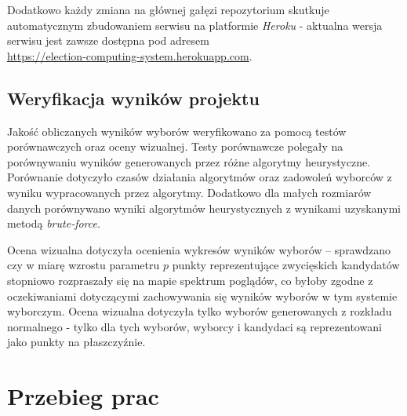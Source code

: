 \documentclass[pdflatex,11pt]{../aghdoc_version2}
\begin{document}
Dodatkowo każdy zmiana na głównej gałęzi repozytorium skutkuje automatycznym zbudowaniem serwisu na platformie \textit{Heroku} - aktualna wersja serwisu jest zawsze dostępna pod adresem \\  \url{https://election-computing-system.herokuapp.com}.

\section{Weryfikacja wyników projektu}
Jakość obliczanych wyników wyborów weryfikowano za pomocą testów
porównawczych oraz oceny wizualnej. Testy porównawcze polegały na porównywaniu wyników generowanych przez różne
algorytmy heurystyczne. Porównanie dotyczyło czasów działania algorytmów oraz zadowoleń wyborców z wyniku wypracowanych przez algorytmy. Dodatkowo dla małych rozmiarów danych porównywano wyniki algorytmów heurystycznych z wynikami uzyskanymi metodą \textit{brute-force}.

Ocena wizualna dotyczyła ocenienia wykresów wyników wyborów – sprawdzano czy w miarę wzrostu parametru $p$ punkty reprezentujące zwycięskich kandydatów stopniowo rozpraszały się na mapie spektrum poglądów, co byłoby zgodne z oczekiwaniami dotyczącymi zachowywania się wyników wyborów w tym systemie wyborczym. Ocena wizualna dotyczyła tylko wyborów generowanych z rozkładu normalnego - tylko dla tych wyborów, wyborcy i kandydaci są reprezentowani jako punkty na płaszczyźnie.

\chapter{Przebieg prac}
\end{document}
